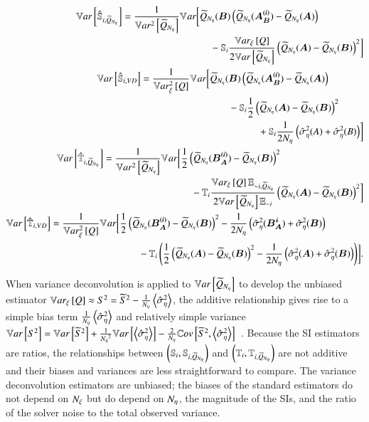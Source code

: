 \begin{align} \label{m4eq:var-s-stan}
\begin{split}
    \mathbb{V}ar\left[\hat{\mathbb{S}}_{i, \widetilde{Q}_{{N_\eta}}}\right] &= \frac{1}{\mathbb{V}ar^2\left[\widetilde{Q}_{{N_\eta}}\right]} \mathbb{V}_{}ar \biggl[\widetilde{Q}_{{N_\eta}}(\bm{B}) \left( \widetilde{Q}_{{N_\eta}}(\bm{A_B^{(i)}}) - \widetilde{Q}_{{N_\eta}}(\bm{A}) \right) \\
    &\qquad \qquad \qquad \qquad \quad  - \mathbb{S}_{i} \frac{\mathbb{V}ar_{\xi}\left[Q\right]}{2\mathbb{V}ar\left[\widetilde{Q}_{{N_\eta}}\right]} \left( \widetilde{Q}_{{N_\eta}}(\bm{A}) - \widetilde{Q}_{{N_\eta}}(\bm{B}) \right)^2 \biggr]
\end{split} \\ \label{m4eq:var-s-vd}
\begin{split}
    \mathbb{V}ar\left[\hat{\mathbb{S}}_{i, VD}\right] &= \frac{1}{\mathbb{V}ar^2_{\xi}\left[Q\right]} \mathbb{V}_{} ar \biggl[\widetilde{Q}_{{N_\eta}}(\bm{B}) \left( \widetilde{Q}_{{N_\eta}}(\bm{A_B^{(i)}}) - \widetilde{Q}_{{N_\eta}}(\bm{A}) \right) \\
    &\qquad \qquad \qquad \qquad \quad - \mathbb{S}_{i} \frac{1}{2} \left( \widetilde{Q}_{{N_\eta}}(\bm{A}) - \widetilde{Q}_{{N_\eta}}(\bm{B}) \right)^2 \\
    &\qquad \qquad \qquad \qquad \qquad \qquad + \mathbb{S}_{i} \frac{1}{2{N_\eta}} \left( \hat{\sigma}^2_\eta(A) + \hat{\sigma}^2_\eta(B) \right) \biggr]
\end{split} \\ \label{m4eq:var-t-stan}
\begin{split}
    \mathbb{V}ar\left[\hat{\mathbb{T}}_{i, \widetilde{Q}_{{N_\eta}}}\right] &= \frac{1}{\mathbb{V}ar^2\left[\widetilde{Q}_{{N_\eta}}\right]} \mathbb{V}_{} ar \biggl[\frac{1}{2} \left( \widetilde{Q}_{{N_\eta}}(\bm{B_A^{(i)}}) - \widetilde{Q}_{{N_\eta}}(\bm{B}) \right)^2 \\
    &\qquad \qquad \qquad \qquad \quad - \mathbb{T}_{i} \frac{\mathbb{V}ar_{\xi}\left[Q\right] \mathbb{E}_{{\sim i}, \widetilde{Q}_{{N_\eta}}}}{2\mathbb{V}ar\left[\widetilde{Q}_{{N_\eta}}\right] \mathbb{E}_{{\sim i}}} \left( \widetilde{Q}_{{N_\eta}}(\bm{A}) - \widetilde{Q}_{{N_\eta}}(\bm{B}) \right)^2 \biggr] 
\end{split} \\ \label{m4eq:var-t-vd}
\begin{split}
    \mathbb{V}ar\left[\hat{\mathbb{T}}_{i, VD}\right] &= \frac{1}{\mathbb{V}ar^2_{\xi}\left[Q\right]} \mathbb{V}_{} ar \biggl[\frac{1}{2} \left( \widetilde{Q}_{{N_\eta}}(\bm{B_A^{(i)}}) - \widetilde{Q}_{{N_\eta}}(\bm{B}) \right)^2 - \frac{1}{2{N_\eta}} \left( \hat{\sigma}^2_\eta(\bm{B_A^i}) + \hat{\sigma}^2_\eta(\bm{B}) \right) \\
    &\qquad \qquad \qquad \qquad \quad - \mathbb{T}_{i} \left( \frac{1}{2} \left( \widetilde{Q}_{{N_\eta}}(\bm{A}) - \widetilde{Q}_{{N_\eta}}(\bm{B}) \right)^2 - \frac{1}{2{N_\eta}} \left( \hat{\sigma}^2_\eta(\bm{A}) + \hat{\sigma}^2_\eta(\bm{B}) \right) \right) \biggr].
\end{split}
\end{align}

When variance deconvolution is applied to $\mathbb{V}ar\left[\widetilde{Q}_{{N_\eta}}\right]$ to develop the unbiased estimator $\mathbb{V}ar_{\xi}\left[Q\right] \approx S^2 = \widetilde{S}^2 - \frac{1}{{N_\eta}}\left< \hat{\sigma}^2_\eta \right>$, the additive relationship gives rise to a simple bias term $\frac{1}{{N_\eta}}\left< \hat{\sigma}^2_\eta \right>$ and relatively simple variance $\mathbb{V}ar\left[S^2\right] = \mathbb{V}ar\left[\widetilde{S}^2\right] + \frac{1}{{N_\eta}^2} \mathbb{V}ar\left[\left< \hat{\sigma}^2_\eta \right>\right] - \frac{2}{{N_\eta}} \mathbb{C}ov\left[\widetilde{S}^2,\left< \hat{\sigma}^2_\eta \right>\right]$~\cite{clements-etal-2024}.
Because the SI estimators are ratios, the relationships between $\left(\mathbb{S}_{i},\mathbb{S}_{i, \widetilde{Q}_{{N_\eta}}}\right)$ and $\left(\mathbb{T}_{i},\mathbb{T}_{i, \widetilde{Q}_{{N_\eta}}}\right)$ are not additive and their biases and variances are less straightforward to compare.
The variance deconvolution estimators are unbiased; the biases of the standard estimators do not depend on ${N_\xi}$ but do depend on ${N_\eta}$, the magnitude of the SIs, and the ratio of the solver noise to the total observed variance.

